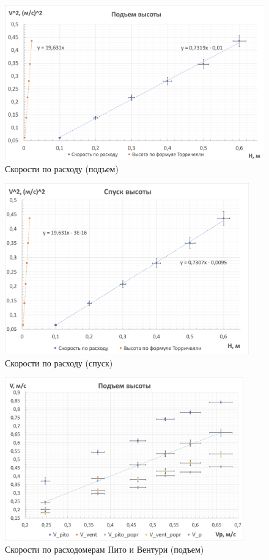 \documentclass[a4paper, 12pt]{article}
\begin{document}
\begin{center}
    

\begin{figure}[h!]
        \includegraphics[width=1.0\textwidth]{graph1.png}
        \caption{Скорости по расходу (подъем)}
        \label{ris:ustanovka}
    \end{figure}

\begin{figure}[h!]
        \includegraphics[width=0.94\textwidth]{graph2.png}
        \caption{Скорости по расходу (спуск)}
        \label{ris:ustanovka}
    \end{figure}

\begin{figure}[h!]
        \includegraphics[width=0.92\textwidth]{graph3.png}
        \caption{Скорости по расходомерам Пито и Вентури (подъем)}
        \label{ris:ustanovka}
    \end{figure}



\end{center}
\end{document}
